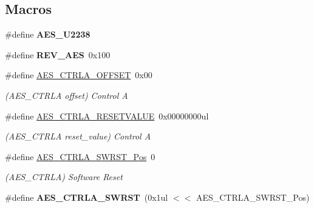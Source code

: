 \subsection*{Macros}
\begin{DoxyCompactItemize}
\item 
\hypertarget{group___s_a_m_l21___a_e_s_gad86575515ebb3ae9d7705b62e5fcb211}{}\#define {\bfseries A\+E\+S\+\_\+\+U2238}\label{group___s_a_m_l21___a_e_s_gad86575515ebb3ae9d7705b62e5fcb211}

\item 
\hypertarget{group___s_a_m_l21___a_e_s_gac0cadb7b3e9d00f74f7ed80814d9524b}{}\#define {\bfseries R\+E\+V\+\_\+\+A\+E\+S}~0x100\label{group___s_a_m_l21___a_e_s_gac0cadb7b3e9d00f74f7ed80814d9524b}

\item 
\hypertarget{group___s_a_m_l21___a_e_s_ga90e931857a085af986881f27722999e4}{}\#define \hyperlink{group___s_a_m_l21___a_e_s_ga90e931857a085af986881f27722999e4}{A\+E\+S\+\_\+\+C\+T\+R\+L\+A\+\_\+\+O\+F\+F\+S\+E\+T}~0x00\label{group___s_a_m_l21___a_e_s_ga90e931857a085af986881f27722999e4}

\begin{DoxyCompactList}\small\item\em (A\+E\+S\+\_\+\+C\+T\+R\+L\+A offset) Control A \end{DoxyCompactList}\item 
\hypertarget{group___s_a_m_l21___a_e_s_gad9c6d6bda70f75bbf70b8e1b5acba337}{}\#define \hyperlink{group___s_a_m_l21___a_e_s_gad9c6d6bda70f75bbf70b8e1b5acba337}{A\+E\+S\+\_\+\+C\+T\+R\+L\+A\+\_\+\+R\+E\+S\+E\+T\+V\+A\+L\+U\+E}~0x00000000ul\label{group___s_a_m_l21___a_e_s_gad9c6d6bda70f75bbf70b8e1b5acba337}

\begin{DoxyCompactList}\small\item\em (A\+E\+S\+\_\+\+C\+T\+R\+L\+A reset\+\_\+value) Control A \end{DoxyCompactList}\item 
\hypertarget{group___s_a_m_l21___a_e_s_gad701aaa88264f53b847405a38b088351}{}\#define \hyperlink{group___s_a_m_l21___a_e_s_gad701aaa88264f53b847405a38b088351}{A\+E\+S\+\_\+\+C\+T\+R\+L\+A\+\_\+\+S\+W\+R\+S\+T\+\_\+\+Pos}~0\label{group___s_a_m_l21___a_e_s_gad701aaa88264f53b847405a38b088351}

\begin{DoxyCompactList}\small\item\em (A\+E\+S\+\_\+\+C\+T\+R\+L\+A) Software Reset \end{DoxyCompactList}\item 
\hypertarget{group___s_a_m_l21___a_e_s_gac549276655cfe2e832c329960f66c8df}{}\#define {\bfseries A\+E\+S\+\_\+\+C\+T\+R\+L\+A\+\_\+\+S\+W\+R\+S\+T}~(0x1ul $<$$<$ A\+E\+S\+\_\+\+C\+T\+R\+L\+A\+\_\+\+S\+W\+R\+S\+T\+\_\+\+Pos)\label{group___s_a_m_l21___a_e_s_gac549276655cfe2e832c329960f66c8df}


\end{DoxyCompactItemize}

